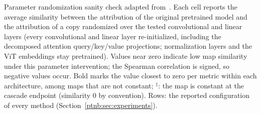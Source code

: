 \begin{table}[tbp]
\centering
\scriptsize
\caption[Parameter randomization sanity check]{Parameter randomization sanity check adapted from~\textcite{Adebayo2018sanity}. Each cell reports the average similarity between the attribution of the original pretrained model and the attribution of a copy randomized over the tested convolutional and linear layers (every convolutional and linear layer re-initialized, including the decomposed attention query/key/value projections; normalization layers and the ViT embeddings stay pretrained). Values near zero indicate low map similarity under this parameter intervention; the Spearman correlation is signed, so negative values occur. Bold marks the value closest to zero per metric within each architecture, among maps that are not constant; $^{\ddagger}$: the map is constant at the cascade endpoint (similarity $0$ by convention). Rows: the reported configuration of every method (Section~\ref{ptnb:sec:experiments}).}
\label{tab:sanity-check}
%
\end{table}
